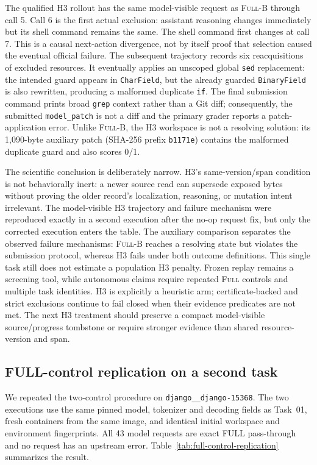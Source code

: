\documentclass[11pt]{article}
\begin{document}
The qualified H3 rollout has the same model-visible request as
\textsc{Full}-B through call 5. Call 6 is the first actual exclusion: assistant
reasoning changes immediately but its shell command remains the same. The shell
command first changes at call 7. This is a causal next-action divergence, not
by itself proof that selection caused the eventual official failure. The
subsequent trajectory records six reacquisitions of excluded
resources. It eventually applies an unscoped global \texttt{sed} replacement:
the intended guard appears in \texttt{CharField}, but the already guarded
\texttt{BinaryField} is also rewritten, producing a malformed duplicate
\texttt{if}. The final submission command prints broad \texttt{grep} context
rather than a Git diff; consequently, the submitted \texttt{model\_patch} is
not a diff and the primary grader reports a patch-application error. Unlike
\textsc{Full}-B, the H3 workspace is not a resolving solution: its 1,090-byte
auxiliary patch (SHA-256 prefix \texttt{b1171e}) contains the malformed duplicate
guard and also scores 0/1.

The scientific conclusion is deliberately narrow. H3's same-version/span
condition is not behaviorally inert: a newer source read can supersede exposed
bytes without proving the older record's localization, reasoning, or mutation
intent irrelevant. The model-visible H3 trajectory and failure mechanism were
reproduced exactly in a second execution after the no-op request fix, but only
the corrected execution enters the table. The auxiliary comparison separates
the observed failure mechanisms: \textsc{Full}-B reaches a resolving state but
violates the submission protocol, whereas H3 fails under both outcome
definitions. This single task still does not estimate a population H3 penalty.
Frozen replay remains a screening tool, while autonomous claims require
repeated \textsc{Full} controls and multiple task identities. H3 is explicitly a
heuristic arm; certificate-backed and strict exclusions continue to fail closed
when their evidence predicates are not met. The next H3 treatment should
preserve a compact model-visible source/progress tombstone or require stronger
evidence than shared resource-version and span.

\subsection{FULL-control replication on a second task}

We repeated the two-control procedure on
\texttt{django\_\_django-15368}. The two executions use the same pinned model,
tokenizer and decoding fields as Task~01, fresh containers from the same image,
and identical initial workspace and environment fingerprints. All 43 model
requests are exact FULL pass-through and no request has an upstream error.
Table~\ref{tab:full-control-replication} summarizes the result.
\end{document}
